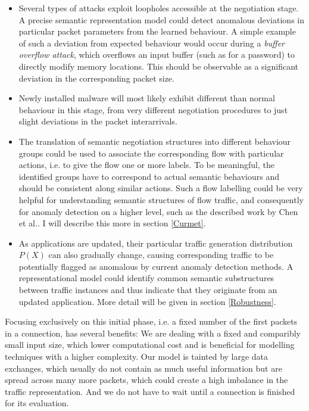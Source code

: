 \documentclass[a4paper,12pt,twoside]{report}
\begin{document}
\begin{itemize}
\item Several types of attacks exploit loopholes accessible at the negotiation stage. A precise semantic representation model could detect anomalous deviations in particular packet parameters from the learned behaviour. A simple example of such a deviation from expected behaviour would occur during a \textit{buffer overflow attack}, which overflows an input buffer (such as for a password) to directly modify memory locations. This should be observable as a significant deviation in the corresponding packet size.

\item Newly installed malware will most likely exhibit different than normal behaviour in this stage, from very different negotiation procedures to just slight deviations in the packet interarrivals.

\item The translation of semantic negotiation structures into different behaviour groups could be used to associate the corresponding flow with particular actions, i.e. to give the flow one or more labels. To be meaningful, the identified groups have to correspond to actual semantic behaviours and should be consistent along similar actions. 
Such a flow labelling could be very helpful for understanding semantic structures of flow traffic, and consequently for anomaly detection on a higher level, such as the described work by Chen et al.\cite{chen_more_2016}. I will describe this more in section \ref{Curmet}.

\item As applications are updated, their particular traffic generation distribution $P(X)$ can also  gradually change, causing corresponding traffic to be potentially flagged as anomalous by current anomaly detection methods. A representational model could identify common semantic substructures between traffic instances and thus indicate that they originate from an updated application. More detail will be given in section \ref{Robustness}.

\end{itemize}

Focusing exclusively on this initial phase, i.e. a fixed number of the first packets in a connection, has several benefits: We are dealing with a fixed and comparibly small input size, which lower computational cost and is beneficial for modelling techniques with a higher complexity. Our model is tainted by large data exchanges, which usually do not contain as much useful information but are spread across many more packets, which could create a high imbalance in the traffic representation. And we do not have to wait until a connection is finished for its evaluation.
\end{document}
